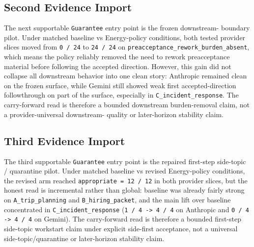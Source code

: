 \documentclass[11pt]{article}
\begin{document}
\subsection{Second Evidence Import}

The next supportable \texttt{Guarantee} entry point is the frozen downstream-
boundary pilot. Under matched baseline vs Energy-policy conditions, both tested
provider slices moved from \texttt{0 / 24} to \texttt{24 / 24} on
\texttt{preacceptance\_rework\_burden\_absent}, which means the policy reliably
removed the need to rework preacceptance material before following the accepted
direction. However, this gain did not collapse all downstream behavior into one
clean story: Anthropic remained clean on the frozen surface, while Gemini still
showed weak first accepted-direction followthrough on part of the surface,
especially in \texttt{C\_incident\_response}. The carry-forward read is therefore
a bounded downstream burden-removal claim, not a provider-universal downstream-
quality or later-horizon stability claim.

\subsection{Third Evidence Import}

The third supportable \texttt{Guarantee} entry point is the repaired first-step
side-topic / quarantine pilot. Under matched baseline vs revised Energy-policy
conditions, the revised arm reached \texttt{appropriate = 12 / 12} in both
provider slices, but the honest read is incremental rather than global:
baseline was already fairly strong on \texttt{A\_trip\_planning} and
\texttt{B\_hiring\_packet}, and the main lift over baseline concentrated in
\texttt{C\_incident\_response} (\texttt{1 / 4 -> 4 / 4} on Anthropic and
\texttt{0 / 4 -> 4 / 4} on Gemini). The carry-forward read is therefore a
bounded first-step side-topic workstart claim under explicit side-first
acceptance, not a universal side-topic/quarantine or later-horizon stability
claim.
\end{document}
